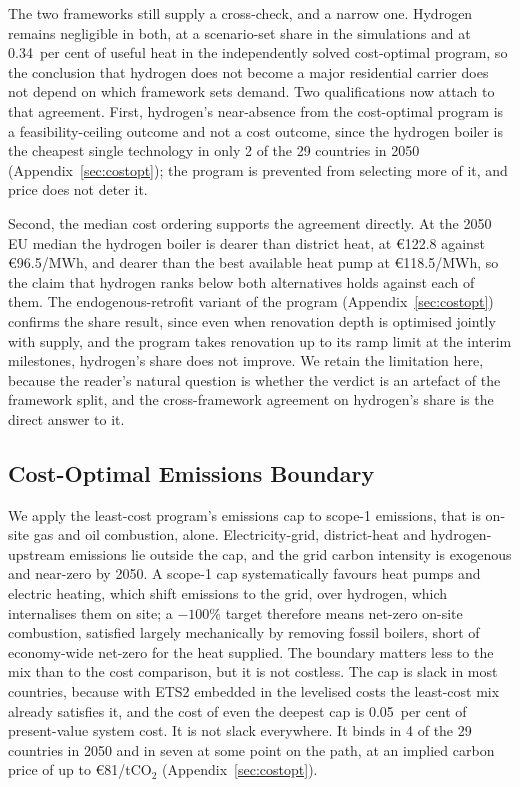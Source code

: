 The two frameworks still supply a cross-check, and a narrow one. Hydrogen remains negligible in both, at a scenario-set share in the simulations
and at 0.34~per cent of useful heat in the independently solved cost-optimal program, so
the conclusion that hydrogen does not become a major residential carrier does not depend
on which framework sets demand. Two qualifications now attach to that agreement. First,
hydrogen's near-absence from the cost-optimal program is a feasibility-ceiling outcome
and not a cost outcome, since the hydrogen boiler is the cheapest single technology in only
2 of the 29 countries in 2050 (Appendix~\ref{sec:costopt}); the program is prevented
from selecting more of it, and price does not deter it.

Second, the median cost ordering supports the agreement directly. At the 2050 EU median
the hydrogen boiler is dearer than district heat, at \euro{}122.8 against
\euro{}96.5/MWh, and dearer than the best available heat pump at \euro{}118.5/MWh, so
the claim that hydrogen ranks below both alternatives holds against each of them. The
endogenous-retrofit variant of the program (Appendix~\ref{sec:costopt}) confirms
the share result, since even when renovation depth is optimised jointly with supply, and the program takes renovation up to its ramp limit at the interim milestones, hydrogen's share does not improve. We retain the limitation here, because the reader's
natural question is whether the verdict is an artefact of the framework split, and the
cross-framework agreement on hydrogen's share is the direct answer to it.

\subsection{Cost-Optimal Emissions Boundary}
We apply the least-cost program's emissions cap to scope-1 emissions, that is on-site
gas and oil combustion, alone. Electricity-grid, district-heat and hydrogen-upstream
emissions lie outside the cap, and the grid carbon intensity is exogenous and near-zero
by 2050. A scope-1 cap systematically favours heat pumps and electric heating, which
shift emissions to the grid, over hydrogen, which internalises them on site; a $-100\%$
target therefore means net-zero on-site combustion, satisfied largely mechanically by
removing fossil boilers, short of economy-wide net-zero for the heat supplied. The boundary matters less to the mix than to the cost comparison, but it is
not costless.
The cap is slack in most countries, because with ETS2 embedded in the levelised costs
the least-cost mix already satisfies it, and the cost of even the deepest cap is
0.05~per cent of present-value system cost. It is not slack everywhere. It binds in 4 of the 29 countries in 2050 and in seven at some point on the path, at an implied carbon
price of up to \euro{}81/tCO$_2$ (Appendix~\ref{sec:costopt}).

